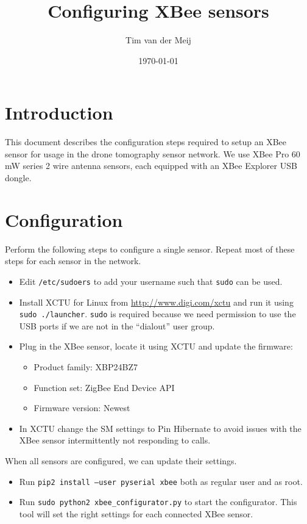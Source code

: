 \documentclass{article}
\begin{document}
\title{Configuring XBee sensors}
\author{Tim van der Meij}
\date{\today}

\maketitle

\section{Introduction}
This document describes the configuration steps required to setup an XBee sensor
for usage in the drone tomography sensor network. We use XBee Pro 60 mW series 2
wire antenna sensors, each equipped with an XBee Explorer USB dongle.

\section{Configuration}
Perform the following steps to configure a single sensor. Repeat most of these
steps for each sensor in the network.

\begin{itemize}
    \item Edit {\tt /etc/sudoers} to add your username such that {\tt sudo} can
          be used.
    \item Install XCTU for Linux from \url{http://www.digi.com/xctu} and run it
          using {\tt sudo~./launcher}. {\tt sudo} is required because we need
          permission to use the USB ports if we are not in the ``dialout'' user
          group.
    \item Plug in the XBee sensor, locate it using XCTU and update the firmware:
          \begin{itemize}
              \item Product family: XBP24BZ7
              \item Function set: ZigBee End Device API
              \item Firmware version: Newest
          \end{itemize}
    \item In XCTU change the SM settings to Pin Hibernate to avoid issues
          with the XBee sensor intermittently not responding to calls.
\end{itemize}

When all sensors are configured, we can update their settings.

\begin{itemize}
    \item Run {\tt pip2 install --user pyserial xbee} both as regular user and
          as root.
    \item Run {\tt sudo python2 xbee\_configurator.py} to start the configurator.
          This tool will set the right settings for each connected XBee sensor.
\end{itemize}
\end{document}
